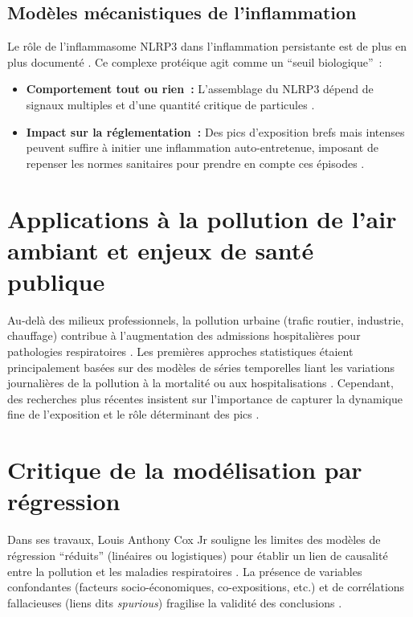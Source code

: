 \subsection{Modèles mécanistiques de l’inflammation}
Le rôle de l’inflammasome NLRP3 dans l’inflammation persistante est de plus en plus documenté \citep{Donaldson2010,Sayan2016}. Ce complexe protéique agit comme un ``seuil biologique'' :
\begin{itemize}
	\item \textbf{Comportement tout ou rien :} L’assemblage du NLRP3 dépend de signaux multiples et d’une quantité critique de particules \citep{Groslambert2018}.
	\item \textbf{Impact sur la réglementation :} Des pics d’exposition brefs mais intenses peuvent suffire à initier une inflammation auto-entretenue, imposant de repenser les normes sanitaires pour prendre en compte ces épisodes \citep{Cox2019}.
\end{itemize}

\section{Applications à la pollution de l’air ambiant et enjeux de santé publique}
Au-delà des milieux professionnels, la pollution urbaine (trafic routier, industrie, chauffage) contribue à l’augmentation des admissions hospitalières pour pathologies respiratoires \citep{Cho2011,Gomes2014}. Les premières approches statistiques étaient principalement basées sur des modèles de séries temporelles liant les variations journalières de la pollution à la mortalité ou aux hospitalisations \citep{Kim2003,Cox1996}. Cependant, des recherches plus récentes insistent sur l’importance de capturer la dynamique fine de l’exposition et le rôle déterminant des pics \citep{Gottschalk2016,Sayan2016}.

\section{Critique de la modélisation par régression}
\label{sec:RegressionCriticism}
Dans ses travaux, Louis Anthony Cox Jr souligne les limites des modèles de régression ``réduits'' (linéaires ou logistiques) pour établir un lien de causalité entre la pollution et les maladies respiratoires \citep{cox2021quantitative}. La présence de variables confondantes (facteurs socio-économiques, co-expositions, etc.) et de corrélations fallacieuses (liens dits \emph{spurious}) fragilise la validité des conclusions \citep{Cui2003,Sneeringer2009,Selvin1984}.

